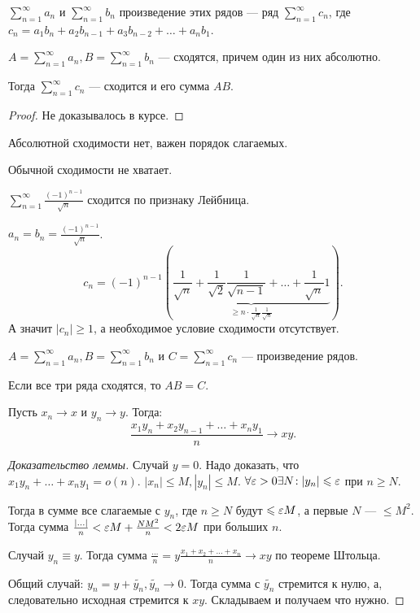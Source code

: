\begin{definition}
    $\sum\limits_{n=1}^\infty a_n$ и $\sum\limits_{n=1}^\infty b_n$ произведение этих рядов --- ряд  $\sum\limits_{n=1}^\infty c_n$, где  $c_n = a_1b_n + a_2b_{n-1} + a_3b_{n-2} + \ldots + a_nb_1$.
\end{definition}
\begin{theorem}
    $A = \sum\limits_{n=1}^\infty a_n, B = \sum\limits_{n=1}^\infty b_n$ --- сходятся, причем один из них абсолютно.

    Тогда  $\sum\limits_{n=1}^\infty c_n$ --- сходится и его сумма  $AB$.
\end{theorem}
\begin{proof}
    Не доказывалось в курсе.
\end{proof}
\begin{remark}
    Абсолютной сходимости нет, важен порядок слагаемых.
\end{remark}
\begin{remark}
    Обычной сходимости не хватает.
\end{remark}
\begin{example}
    $\sum\limits_{n=1}^\infty \frac{(-1)^{n-1}}{\sqrt{n}}$ сходится по признаку Лейбница.

    $a_n = b_n = \frac{(-1)^{n-1}}{\sqrt{n}}$. \[c_n = (-1)^{n-1}(\underbrace{\frac{1}{\sqrt{n}} + \frac{1}{\sqrt{2}}\frac{1}{\sqrt{n-1}} + \ldots + \frac{1}{\sqrt{n}}1}_{\ge n \cdot \frac{1}{\sqrt{n}} \frac{1}{\sqrt{n}}}).\]
    А значит $|c_n| \ge 1$, а необходимое условие сходимости отсутствует. 
\end{example}
\begin{theorem}
    $A = \sum\limits_{n=1}^\infty a_n, B = \sum\limits_{n=1}^\infty b_n$ и  $C = \sum\limits_{n=1}^\infty c_n$ ---  произведение рядов.

    Если все три ряда сходятся, то  $AB=C$.
\end{theorem}
\begin{lemma}
    Пусть $x_n \to x$ и  $y_n \to y$. Тогда:
     \[
    \frac{x_1y_n + x_2y_{n-1} + \ldots + x_ny_1}{n} \to xy
    .\] 
\end{lemma}
\begin{proof}[Доказательство леммы]
    Случай $y=0$. Надо доказать, что $x_1y_n + \ldots + x_ny_1 = o(n)$. $|x_n| \le M, |y_n| \le M$. $\forall \varepsilon > 0 \exists N\!: |y_n| \leqslant \varepsilon$ при $n \ge N$.

    Тогда в сумме все слагаемые с  $y_n$, где  $n \ge N$ будут $\leqslant \varepsilon M$, а первые $N$ ---  $\le M^2$. Тогда сумма $\frac{|\ldots|}{n} < \varepsilon M + \frac{NM^2}{n} < 2\varepsilon M$ при больших $n$.

    Случай  $y_n \equiv y$. Тогда сумма $\frac{\ldots}{n} = y \frac{x_1 + x_2 + \ldots + x_n}{n} \to xy$ по теореме Штольца.

    Общий случай: $y_n = y + \widetilde{y_n}, \widetilde{y_n} \to 0$. Тогда сумма с  $\widetilde{y_n}$ стремится к нулю, а, следовательно исходная стремится к  $xy$. Складываем и получаем что нужно.
\end{proof}
